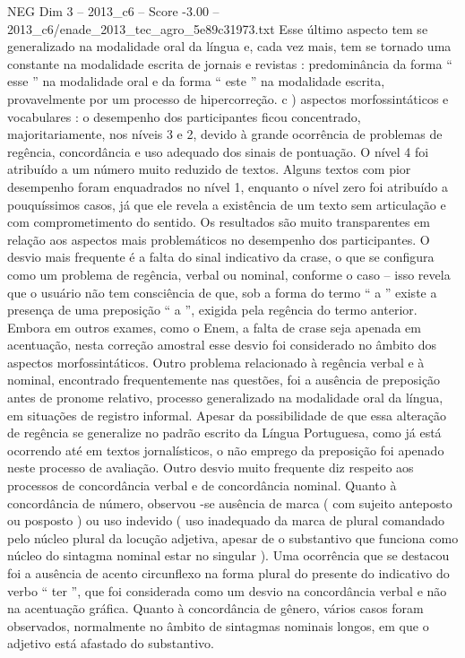 \begin{textsample}{NEG Dim 3 – 2013\_c6 – Score -3.00 – 2013\_c6/enade\_2013\_tec\_agro\_5e89c31973.txt}
Esse último aspecto tem se generalizado na modalidade oral da língua e, cada vez mais, tem se tornado uma constante na modalidade escrita de jornais e revistas : predominância da forma “ esse ” na modalidade oral e da forma “ este ” na modalidade escrita, provavelmente por um processo de hipercorreção. c ) aspectos morfossintáticos e vocabulares : o desempenho dos participantes ficou concentrado, majoritariamente, nos níveis 3 e 2, devido à grande ocorrência de problemas de regência, concordância e uso adequado dos sinais de pontuação.
O nível 4 foi atribuído a um número muito reduzido de textos.
Alguns textos com pior desempenho foram enquadrados no nível 1, enquanto o nível zero foi atribuído a pouquíssimos casos, já que ele revela a existência de um texto sem articulação e com comprometimento do sentido.
Os resultados são muito transparentes em relação aos aspectos mais problemáticos no desempenho dos participantes.
O desvio mais frequente é a falta do sinal indicativo da crase, o que se configura como um problema de regência, verbal ou nominal, conforme o caso – isso revela que o usuário não tem consciência de que, sob a forma do termo “ a ” existe a presença de uma preposição “ a ”, exigida pela regência do termo anterior.
Embora em outros exames, como o Enem, a falta de crase seja apenada em acentuação, nesta correção amostral esse desvio foi considerado no âmbito dos aspectos morfossintáticos.
Outro problema relacionado à regência verbal e à nominal, encontrado frequentemente nas questões, foi a ausência de preposição antes de pronome relativo, processo generalizado na modalidade oral da língua, em situações de registro informal.
Apesar da possibilidade de que essa alteração de regência se generalize no padrão escrito da Língua Portuguesa, como já está ocorrendo até em textos jornalísticos, o não emprego da preposição foi apenado neste processo de avaliação.
Outro desvio muito frequente diz respeito aos processos de concordância verbal e de concordância nominal.
Quanto à concordância de número, observou -se ausência de marca ( com sujeito anteposto ou posposto ) ou uso indevido ( uso inadequado da marca de plural comandado pelo núcleo plural da locução adjetiva, apesar de o substantivo que funciona como núcleo do sintagma nominal estar no singular ).
Uma ocorrência que se destacou foi a ausência de acento circunflexo na forma plural do presente do indicativo do verbo “ ter ”, que foi considerada como um desvio na concordância verbal e não na acentuação gráfica.
Quanto à concordância de gênero, vários casos foram observados, normalmente no âmbito de sintagmas nominais longos, em que o adjetivo está afastado do substantivo.

\end{textsample}
